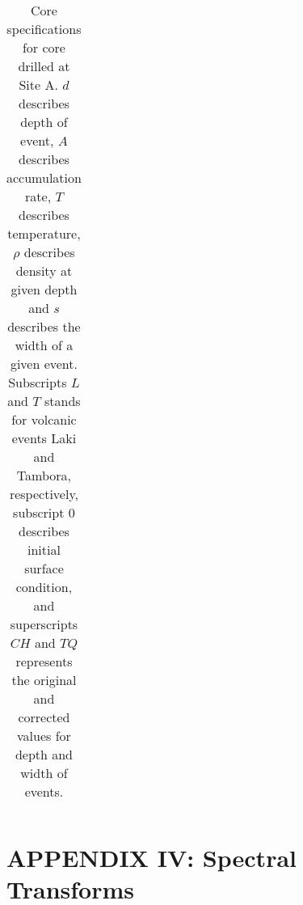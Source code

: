 \documentclass[../../CompleteThesis2/Complete_2ndDraft.tex]{subfiles}
\begin{document}
\begin{table}[h]
\begin{tabular}{l l|c c c c c}
		\end{tabular}
		\caption[Core specifications for core drilled at Site A.]{\small Core specifications for core drilled at Site A. $d$ describes depth of event, $A$ describes accumulation rate, $T$ describes temperature, $\rho$ describes density at given depth and $s$ describes the width of a given event. Subscripts $L$ and $T$ stands for volcanic events Laki and Tambora, respectively, subscript $0$ describes initial surface condition, and superscripts $CH$ and $TQ$ represents the original and corrected values for depth and width of events.}
		\label{Tab:SiteA_CoreSpecs}
	\end{table}
	\newpage
	\section[Appendix IV: Spectral Transforms]{APPENDIX IV: Spectral Transforms}
	\label{AppIV:SpectralTransforms}		
\end{document}
